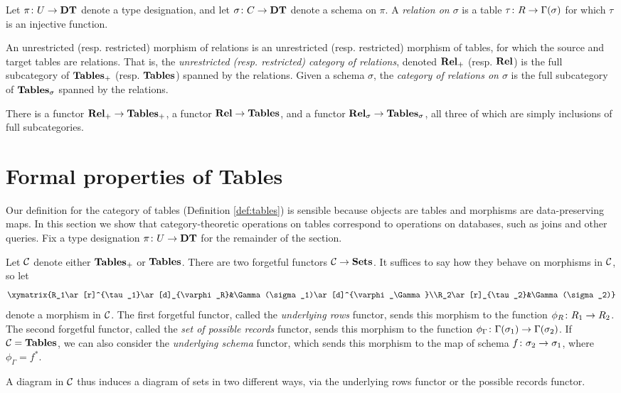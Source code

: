 \documentclass{amsart}
\def\DT{{\bf DT}}
\def\Tables{{\bf Tables}}
\def\Rel{{\bf Rel}}
\begin{document}
\begin{definition}

Let $\pi\taking U\to\DT$ denote a type designation, and let $\sigma\taking C\to\DT$ denote a schema on $\pi$.  A {\em relation on $\sigma$} is a table $\tau\colon R\rightarrow\Gamma(\sigma)$ for which $\tau$ is an injective function.  

An unrestricted (resp. restricted) morphism of relations is an unrestricted (resp. restricted) morphism of tables, for which the source and target tables are relations.  That is, the {\em unrestricted (resp. restricted) category of relations}, denoted $\Rel_+$ (resp. $\Rel$) is the full subcategory of $\Tables_+$ (resp. $\Tables$) spanned by the relations.  Given a schema $\sigma$, the {\em category of relations on $\sigma$} is the full subcategory of $\Tables_\sigma$ spanned by the relations.

There is a functor $\Rel_+\to\Tables_+$, a functor $\Rel\to\Tables$, and a functor $\Rel_\sigma\to\Tables_\sigma$, all three of which are simply inclusions of full subcategories.

\end{definition}



\section{Formal properties of Tables}

Our definition for the category of tables (Definition \ref{def:tables}) is sensible because objects are tables and morphisms are data-preserving maps.  In this section we show that category-theoretic operations on tables correspond to operations on databases, such as joins and other queries.  Fix a type designation $\pi\taking U\to\DT$ for the remainder of the section.

\begin{definition}\label{def:forgetful}

Let $\mathcal{C}$ denote either $\Tables_+$ or $\Tables$.  There are two forgetful functors $\mathcal{C}\rightarrow{\bf Sets}$.  It suffices to say how they behave on morphisms in $\mathcal{C}$, so let $$\xymatrix{R_1\ar[r]^{\tau_1}\ar[d]_{\varphi_R}&\Gamma(\sigma_1)\ar[d]^{\varphi_\Gamma}\\R_2\ar[r]_{\tau_2}&\Gamma(\sigma_2)}$$ denote a morphism in $\mathcal{C}$.  The first forgetful functor, called the {\em underlying rows} functor, sends this morphism to the function $\phi_R\colon R_1\rightarrow R_2$.  The second forgetful functor, called the {\em set of possible records} functor, sends this morphism to the function $\phi_\Gamma\colon\Gamma(\sigma_1)\rightarrow\Gamma(\sigma_2)$.  If $\mcC=\Tables$, we can also consider the {\em underlying schema} functor, which sends this morphism to the map of schema $f\colon\sigma_2\rightarrow\sigma_1$, where $\phi_\Gamma=f^*$.

A diagram in $\mathcal{C}$ thus induces a diagram of sets in two different ways, via the underlying rows functor or the possible records functor.

\end{definition}
\end{document}
